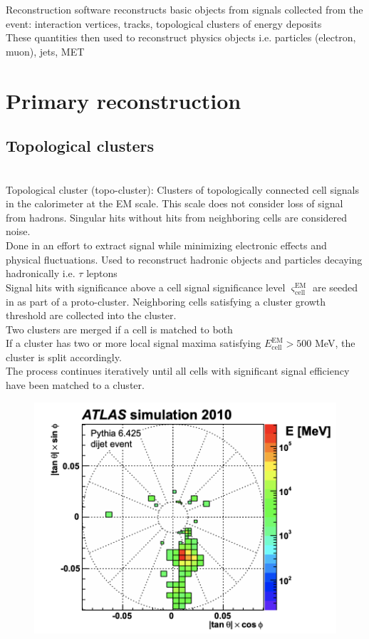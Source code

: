 \documentclass[../thesis.tex]{subfiles}
\begin{document}
\vspace{-1\baselineskip}

Reconstruction software reconstructs basic objects from signals collected from the event: interaction vertices, tracks, topological clusters of energy deposits\\
These quantities then used to reconstruct physics objects i.e. particles (electron, muon), jets, MET

\section{Primary reconstruction}
\label{sec:primaryreco}

\subsection{Topological clusters}
\label{sec:topocluster}
\citep{reco:topocluster}\citep{reco:topocluster_2}\\
Topological cluster (topo-cluster): Clusters of topologically connected cell signals in the calorimeter at the EM scale. This scale does not consider loss of signal from hadrons. Singular hits without hits from neighboring cells are considered noise.\\
Done in an effort to extract signal while minimizing electronic effects and physical fluctuations. 
Used to reconstruct hadronic objects and particles decaying hadronically i.e. $\tau$ leptons\\
Signal hits with significance above a cell signal significance level $\varsigma_\mathrm{cell}^\mathrm{EM}$ are seeded in as part of a proto-cluster. Neighboring cells satisfying a cluster growth threshold are collected into the cluster.\\
Two clusters are merged if a cell is matched to both\\
If a cluster has two or more local signal maxima satisfying $E_\mathrm{cell}^\mathrm{EM}>500$ MeV, the cluster is split accordingly.\\
The process continues iteratively until all cells with significant signal efficiency have been matched to a cluster.\\
\begin{figure}[!htbp]
\begin{center}
\includegraphics[width=0.7\linewidth]{fig/reco_topo1.png}
\caption{\label{fig:reco:topo1}}
\end{center}
\end{figure}
\end{document}
